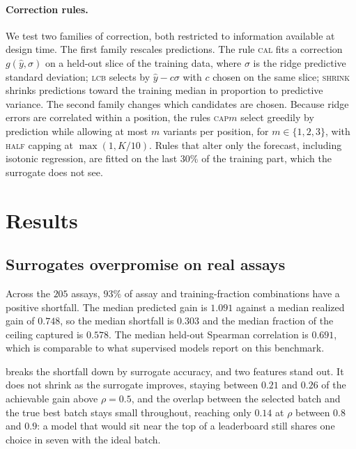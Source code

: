 \documentclass{article}
\theoremstyle{plain}
\theoremstyle{definition}
\newcommand{\yhat}{\hat{y}}
\begin{document}
\paragraph{Correction rules.}
We test two families of correction, both restricted to information available at design
time. The first family rescales predictions. The rule \textsc{cal} fits a correction
$g(\yhat, \sigma)$ on a held-out slice of the training data, where $\sigma$ is the ridge
predictive standard deviation; \textsc{lcb} selects by $\yhat - c\sigma$ with $c$ chosen
on the same slice; \textsc{shrink} shrinks predictions toward the training median in
proportion to predictive variance. The second family changes which candidates are
chosen. Because ridge errors are correlated within a position, the rules
\textsc{cap}$m$ select greedily by prediction while allowing at most $m$ variants per
position, for $m \in \{1,2,3\}$, with \textsc{half} capping at $\max(1, K/10)$. Rules that alter only the forecast,
including isotonic regression, are fitted on the last $30\%$ of the training part,
which the surrogate does not see.

\section{Results}
\label{sec:results}

\subsection{Surrogates overpromise on real assays}
\label{sec:results-gap}

Across the $205$ assays, $93\%$ of assay and training-fraction combinations have a
positive shortfall. The median predicted gain is $1.091$ against a median realized gain
of $0.748$, so the median shortfall is $0.303$ and the median fraction of the ceiling
captured is $0.578$. The median held-out Spearman correlation is $0.691$, which is
comparable to what supervised models report on this benchmark.

 breaks the shortfall down by surrogate accuracy, and two features
stand out. It does not shrink as the surrogate improves, staying between $0.21$ and
$0.26$ of the achievable gain above $\rho = 0.5$, and the overlap between the selected
batch and the true best batch stays small throughout, reaching only $0.14$ at $\rho$
between $0.8$ and $0.9$: a model that would sit near the top of a leaderboard still
shares one choice in seven with the ideal batch.
\end{document}
